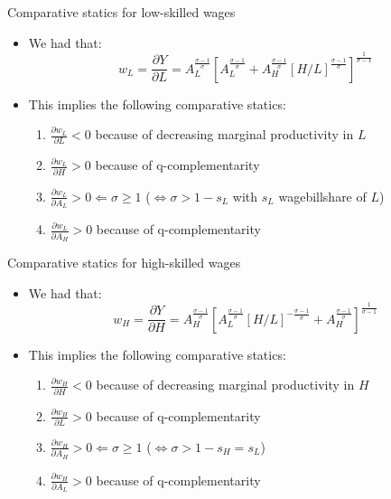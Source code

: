 \documentclass[notes=show]{beamer}
\begin{document}
\begin{frame}{Comparative statics for low-skilled wages}
\begin{itemize}
\item We had that:
\[
w_{L}=\frac{\partial Y}{\partial L}=A_{L}^{\frac{\sigma - 1}{\sigma }} \left[ A_{L}^{\frac{\sigma - 1}{\sigma}} + A_{H}^{\frac{\sigma - 1}{\sigma}} [H/L]^{\frac{\sigma - 1}{\sigma}} \right] ^{\frac{1}{\sigma - 1}} \tag{3} \label{eq3}
\]
\item This implies the following comparative statics: \medskip
\begin{enumerate}
\item $\frac{\partial w_{L}}{\partial L} < 0$ because of decreasing marginal productivity in $L$ \medskip
\item $\frac{\partial w_{L}}{\partial H} > 0$ because of q-complementarity \medskip
\item $\frac{\partial w_{L}}{\partial A_{L}} > 0 \Leftarrow \sigma \geqslant 1 $ ($\Leftrightarrow \sigma > 1 - s_{L} $ with $s_{L}$ wagebillshare of $L$) \medskip 
\item $\frac{\partial w_{L}}{\partial A_{H}} > 0$ because of q-complementarity
\end{enumerate}
\end{itemize}
\end{frame}

\begin{frame}{Comparative statics for high-skilled wages}
\begin{itemize}
\item We had that:
\[
w_{H}=\frac{\partial Y}{\partial H}=A_{H}^{\frac{\sigma - 1}{\sigma }} \left[ A_{L}^{\frac{\sigma - 1}{\sigma}} [H/L]^{-\frac{\sigma - 1}{\sigma}} + A_{H}^{\frac{\sigma - 1}{\sigma}}  \right] ^{\frac{1}{\sigma - 1}} \tag{4} \label{eq4}
\]
\item This implies the following comparative statics: \medskip
\begin{enumerate}
\item $\frac{\partial w_{H}}{\partial H} < 0$ because of decreasing marginal productivity in $H$ \medskip
\item $\frac{\partial w_{H}}{\partial L} > 0$ because of q-complementarity \medskip
\item $\frac{\partial w_{H}}{\partial A_{H}} > 0 \Leftarrow \sigma \geqslant 1 $ ($ \Leftrightarrow \sigma > 1 - s_{H} = s_{L}$) \medskip
\item $\frac{\partial w_{H}}{\partial A_{L}} > 0$ because of q-complementarity
\end{enumerate}
\end{itemize}
\end{frame}
\end{document}
